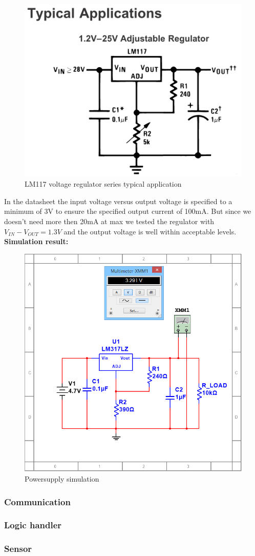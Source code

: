 \begin{figure}[H]
	\centering
	\includegraphics[width=.5\textwidth]{billeder/LM317}
	\caption{LM117 voltage regulator series typical application}
	\label{fig:LM317}
\end{figure}

In the datasheet the input voltage versus output voltage is specified to a minimum of 3V to ensure the specified output current of 100mA. But since we doesn't need more then 20mA at max we tested the regulator with $V_{IN}-V_{OUT}=1.3V$ and the output voltage is well within acceptable levels.\\

\textbf{Simulation result:}\\

\begin{figure}[H]
	\centering
	\includegraphics[width=.5\textwidth]{billeder/PS_lm317_sim}
	\caption{Powersupply simulation}
	\label{fig:ps_sim}
\end{figure}



\subsubsection{Communication}

\subsubsection{Logic handler}

\subsubsection{Sensor}








